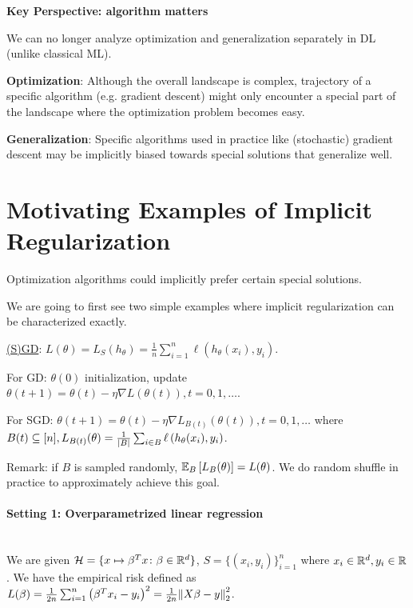 \textbf{Key Perspective: algorithm matters}

We can no longer analyze optimization and generalization separately in DL (unlike classical ML). 

\textbf{Optimization}: Although the overall landscape is complex, trajectory of a specific 
algorithm (e.g. gradient descent) might only encounter a special part of the landscape where 
the optimization problem becomes easy. 

\textbf{Generalization}: Specific algorithms used in practice like (stochastic) gradient 
descent may be implicitly biased towards special solutions that generalize well. 


\section{Motivating Examples of Implicit Regularization}

Optimization algorithms could implicitly prefer certain special solutions. 

We are going to first see two simple examples where implicit regularization can be characterized 
exactly. 

\underline{(S)GD}: \(L(\theta) = L_S(h_\theta) = \frac{1}{n}\sum_{i=1}^n \ell \left(h_\theta (x_i), y_i\right)\). 


For GD: \(\theta(0)\) initialization, update \(\theta(t+1) = \theta(t) - \eta \nabla L \left(\theta(t)\right), t= 0, 1, \ldots\). 

For SGD: \(\theta(t+1) = \theta(t) - \eta \nabla L_{B(t)} \left(\theta(t)\right), t= 0, 1, \ldots\) 
where \(B(t) \subseteq [n], L_{B(t)} (\theta) = \frac{1}{\lvert B \rvert} \sum_{i \in B} \ell 
\left(h_\theta (x_i), y_i\right)\). 

Remark: if \(B\) is sampled randomly, \(\mathbb{E}_B \left[ L_B (\theta) \right] = L(\theta)\). We do random shuffle 
in practice to approximately achieve this goal. 


\paragraph{Setting 1: Overparametrized linear regression} \ \\ 

We are given \(\mathcal{H} = \{  x \mapsto \beta^T x \colon \beta \in \mathbb{R}^d\}\), \(S = \{ (x_i, y_i)\}_{i=1}^n\) where 
\(x_i \in \mathbb{R}^d, y_i \in \mathbb{R}\). We have the empirical risk defined as 
\(L(\beta) = \frac{1}{2n} \sum_{i=1}^n \left(\beta^T x_i - y_i\right)^2 = \frac{1}{2n} \norm{X\beta - y}_2^2\). 

